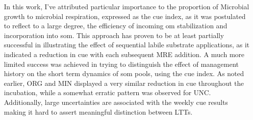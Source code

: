 \documentclass[12pt]{report}
\begin{document}
		In this work, I’ve attributed particular importance to the proportion of Microbial growth to microbial respiration, expressed as the \gls{cue} index, as it was postulated to reflect to a large degree, the efficiency of incoming \gls{om} stabilization and incorporation into \gls{som}. This approach has proven to be at least partially successful in illustrating the effect of sequential labile substrate applications, as it indicated a reduction in \gls{cue} with each subsequent MRE addition. A much more limited success was achieved in trying to distinguish the effect of management history on the short term dynamics of \gls{som} pools, using  the \gls{cue} index. As noted earlier, ORG and MIN displayed a very similar  reduction in \gls{cue} throughout the incubation, while a somewhat erratic pattern was observed for UNC. Additionally, large uncertainties are associated with the weekly \gls{cue} results making it hard to assert  meaningful distinction between LTTs.\\ 
		
\end{document}
